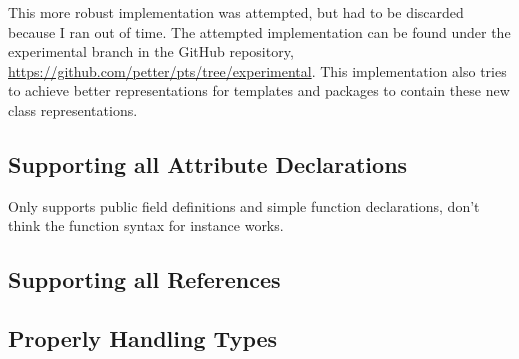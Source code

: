 This more robust implementation was attempted, but had to be discarded because I ran out of time.
The attempted implementation can be found under the experimental branch in the GitHub repository, \url{https://github.com/petter/pts/tree/experimental}.
This implementation also tries to achieve better representations for templates and packages to contain these new class representations.

\subsection{Supporting all Attribute Declarations}\label{subsec:supporting-all-attribute-declarations}

Only supports public field definitions and simple function declarations, don't think the function syntax for instance works.

\subsection{Supporting all References}\label{subsec:supporting-all-references}

\subsection{Properly Handling Types}\label{subsec:properly-handling-types}